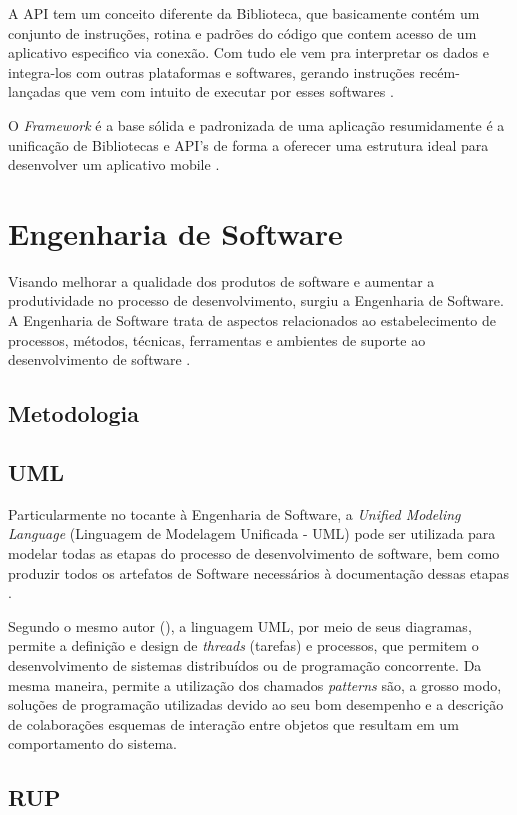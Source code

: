 A API tem um conceito diferente da Biblioteca, que basicamente contém um conjunto de instruções, rotina e padrões do código que contem acesso de um aplicativo especifico via conexão. Com tudo ele vem pra interpretar os dados e integra-los com outras plataformas e softwares, gerando instruções recém-lançadas que vem com intuito de executar por esses softwares \cite{api-2016}.

O \textit{Framework} é a base sólida e padronizada de uma aplicação resumidamente é a unificação de Bibliotecas e API’s de forma a oferecer uma estrutura ideal para desenvolver um aplicativo mobile \cite{abf-2016}.


\section{Engenharia de Software}

Visando melhorar a qualidade dos produtos de software e aumentar a produtividade no processo de desenvolvimento, surgiu a Engenharia de Software. A Engenharia de Software trata de aspectos relacionados ao estabelecimento de processos, métodos, técnicas, ferramentas e ambientes de suporte ao desenvolvimento de software \cite[p. 2]{eng-2014}.

\subsection{Metodologia}

\subsection{UML}

Particularmente no tocante à Engenharia de Software, a \textit{Unified Modeling Language} (Linguagem de Modelagem Unificada - UML) pode ser utilizada para modelar todas as etapas do processo de desenvolvimento de software, bem como produzir todos os artefatos de Software necessários à documentação dessas etapas \cite[p. 12]{eng-2015}.

Segundo o mesmo autor (\citeyear{eng-2015}), a linguagem UML, por meio de seus diagramas, permite a definição e design de \textit{threads} (tarefas) e processos, que permitem o desenvolvimento de sistemas distribuídos ou de programação concorrente. Da mesma maneira, permite a utilização dos chamados \textit{patterns} são, a grosso modo, soluções de programação utilizadas devido ao seu bom desempenho e a descrição de colaborações esquemas de interação entre objetos que resultam em um comportamento do sistema.

\subsection{RUP}